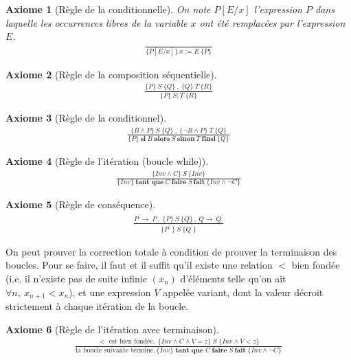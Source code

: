 \documentclass[10pt,a4paper]{article}
\newtheorem{axiom}{Axiome}[section]
\begin{document}
\begin{axiom}[Règle de la conditionnelle]
On note $ P[E/x]$ l'expression $P$ dans laquelle les occurrences libres de la variable $x$ ont été remplacées par l'expression $E$.
\begin{align}
\frac{}{\{P[E/x]\}\ x:=E \ \{P\} }
\end{align}
\end{axiom}

\begin{axiom}[Règle de la composition séquentielle]
\begin{align}
\frac {\{P\}\ S\ \{Q\}\ , \ \{Q\}\ T\ \{R\} } {\{P\}\ S;T\ \{R\}}
\end{align}
\end{axiom}

\begin{axiom}[Règle de la conditionnel]
\begin{align}
\frac { \{B \wedge P\}\ S\ \{Q\}\ ,\ \{\neg B \wedge P \}\ T\ \{Q\} } { \{P\}\ \textbf{si}\ B\ \textbf{alors}\ S\ \textbf{sinon}\ T\ \textbf{finsi}\ \{Q\} }
\end{align}
\end{axiom}

\begin{axiom}[Règle de l'itération (boucle while)]
\begin{align}
\frac { \{Inv \wedge C \}\ S\ \{Inv \} } { \{Inv \}\ \textbf{tant que}\ C\ \textbf{faire}\ S\ \textbf{fait}\ \{Inv \wedge \neg C \} }
\end{align}
\end{axiom}

\begin{axiom}[Règle de conséquence]
\begin{align}
\frac { P^\prime \rightarrow\ P\ ,\ \lbrace P \rbrace\ S\ \lbrace Q \rbrace\ ,\ Q \rightarrow\ Q^\prime } { \lbrace P^\prime\ \rbrace\ S\ \lbrace Q^\prime\rbrace }
\end{align}
\end{axiom}

On peut prouver la correction totale à condition de prouver la terminaison des boucles.
Pour se faire, il faut et il suffit qu'il existe une relation $<$ bien fondée (i.e. il n'existe pas de suite infinie $(x_n)$ d'éléments telle qu'on ait $\forall n, \ x_{n+1} < x_n$), et une expression $V$ appelée variant, dont la valeur décroit strictement à chaque itération de la boucle.

\begin{axiom}[Règle de l'itération avec terminaison]
\begin{align}
\frac{< \textrm{\ est\ bien fondée},\;\{Inv \land C \land V=z \}\;S\;\{Inv \land V < z\}} {\textrm{la boucle suivante termine}, \{Inv\}\;\textbf{tant que}\;C\; \textbf{faire}\; S \ \textbf{fait} \;\{Inv \land \lnot C \} }
\end{align}
\end{axiom}
\end{document}
